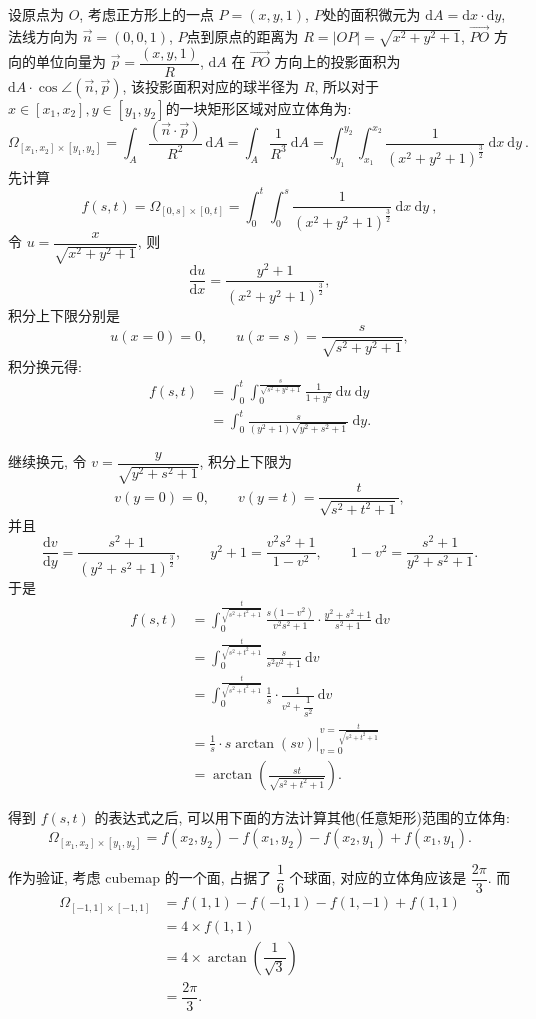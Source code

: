 设原点为 $O$, 考虑正方形上的一点 $P=(x,y,1)$, 
$P$处的面积微元为 $\mathrm{d}A = \mathrm{d}x\cdot\mathrm{d}y$, 法线方向为 $\vec{n} = (0,0,1)$, 
$P$点到原点的距离为 $R = |OP| = \sqrt{x^2+y^2+1}$, $\vec{PO}$ 方向的单位向量为 $\vec{p} = \dfrac{(x,y,1)}{R}$, 
$\mathrm{d}A$ 在 $\vec{PO}$ 方向上的投影面积为 $\mathrm{d}A\cdot\cos\angle(\vec{n},\vec{p})$, 该投影面积对应的球半径为 $R$, 所以对于 $x\in[x_1,x_2], y\in[y_1,y_2]$的一块矩形区域对应立体角为:
\[
\Omega_{[x_1,x_2]\times[y_1,y_2]} = \int_A\frac{(\vec{n}\cdot\vec{p})}{R^2} \ \mathrm{d}A = \int_A\frac{1}{R^3} \ \mathrm{d}A = \int_{y_1}^{y_2}{\int_{x_1}^{x_2}\frac{1}{(x^2+y^2+1)^{\frac{3}{2}}}\ \mathrm{d}x}\ \mathrm{d}y \ .
\]
先计算 
\[f(s,t) = \Omega_{[0,s]\times[0,t]} = \int_0^t{\int_0^s\frac{1}{(x^2+y^2+1)^{\frac{3}{2}}}\ \mathrm{d}x}\ \mathrm{d}y\ , \]
令 $u = \dfrac{x}{\sqrt{x^2+y^2+1}}$, 则
\[\dfrac{\mathrm{d}u}{\mathrm{d}x} = \dfrac{y^2+1}{(x^2+y^2+1)^\frac{3}{2}} ,\] 
积分上下限分别是 
$$u(x=0) = 0, \qquad u(x=s)=\dfrac{s}{\sqrt{s^2+y^2+1}}, $$
积分换元得:
\begin{align*}
f(s,t) &= \int_0^t{\int_0^{\frac{s}{\sqrt{s^2+y^2+1}}}{\frac{1}{1+y^2}}\ \mathrm{d}u}\ \mathrm{d}y\\
&=\int_0^t{\frac{s}{(y^2+1)\sqrt{y^2+s^2+1}}}\ \mathrm{d}y . 
\end{align*}

继续换元, 令 $v = \dfrac{y}{\sqrt{y^2+s^2+1}} $, 积分上下限为 
$$v(y=0) = 0, \qquad v(y=t) = \dfrac{t}{\sqrt{s^2+t^2+1}}, $$
并且
\[\frac{\mathrm{d}v}{\mathrm{d}y} = \frac{s^2+1}{(y^2+s^2+1)^\frac{3}{2}} ,\qquad y^2 + 1 = \frac{v^2s^2+1}{1-v^2} ,\qquad 1-v^2=\frac{s^2+1}{y^2+s^2+1} .\]
于是
\begin{align*}
f(s,t) &= \int_0^\frac{t}{\sqrt{s^2+t^2+1}} {\frac{s(1-v^2)}{v^2s^2+1}\cdot\frac{y^2+s^2+1}{s^2+1}}\ \mathrm{d}v \\ 
&= \int_0^\frac{t}{\sqrt{s^2+t^2+1}}{\frac{s}{s^2v^2+1}}\ \mathrm{d}v\\
&= \int_0^\frac{t}{\sqrt{s^2+t^2+1}}{\frac{1}{s}\cdot\frac{1}{v^2+\dfrac{1}{s^2}}}\ \mathrm{d}v\\
&= \frac{1}{s}\cdot s\arctan(sv)\bigg|_{v=0}^{v=\frac{t}{\sqrt{s^2+t^2+1}}}\\
&= \arctan(\frac{st}{\sqrt{s^2+t^2+1}}) .
\end{align*}

得到 $f(s,t)$ 的表达式之后, 可以用下面的方法计算其他(任意矩形)范围的立体角:
\[\Omega_{[x_1,x_2]\times[y_1,y_2]} = f(x_2,y_2) - f(x_1,y_2) - f(x_2,y_1) + f(x_1,y_1) .\]

作为验证, 考虑 cubemap 的一个面, 占据了 $\dfrac{1}{6}$ 个球面, 对应的立体角应该是 $\dfrac{2\pi}{3}$. 而
\begin{align*}
\Omega_{[-1,1]\times[-1,1]} &= f(1,1) - f(-1,1) - f(1,-1) + f(1,1) \\
& = 4\times f(1,1) \\
&= 4\times \arctan(\dfrac{1}{\sqrt{3}}) \\
& = \dfrac{2\pi}{3} .
\end{align*} 


